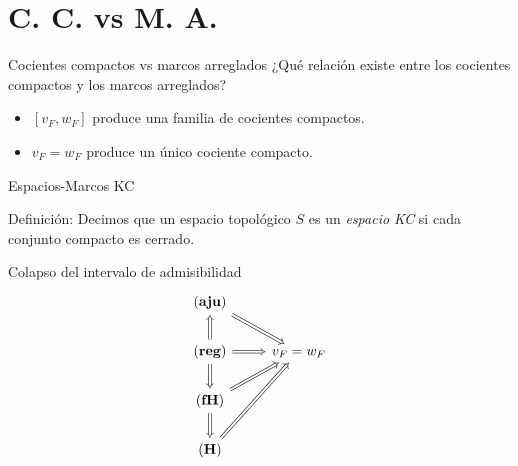 \documentclass[compress,12pt]{beamer}
\begin{document}
\section{C. C. vs M. A.}
\begin{frame}{Cocientes compactos vs marcos arreglados}
¿Qué relación existe entre los cocientes compactos y los marcos arreglados?

\begin{itemize}
    \item<3-> $[v_F, w_F]$ produce una familia de cocientes compactos.
    \item<4-> $v_F=w_F$ produce un único cociente compacto.  
\end{itemize}

\end{frame}

\begin{frame}{Espacios-Marcos KC}
\begin{block}{Definición:}
Decimos que un espacio topológico $S$ es un \emph{ espacio KC} si cada conjunto compacto es cerrado. 
\end{block}


\end{frame}
    
 \begin{frame}[fragile]{Colapso del intervalo de admisibilidad}
        \[\begin{tikzcd}
        {(\mathbf{aju})} \\
        {(\mathbf{reg})} & {v_F=w_F} \\
        {(\mathbf{fH})} \\
        {(\mathbf{H})}
        \arrow[Rightarrow, from=1-1, to=2-2]
        \arrow[Rightarrow, from=2-1, to=1-1]
        \arrow[Rightarrow, from=2-1, to=2-2]
        \arrow[Rightarrow, from=2-1, to=3-1]
        \arrow[Rightarrow, from=3-1, to=2-2]
        \arrow[Rightarrow, from=3-1, to=4-1]
        \arrow[Rightarrow, from=4-1, to=2-2]
    \end{tikzcd}\]
    \end{frame}
\end{document}
